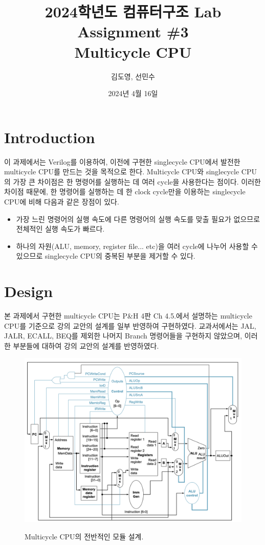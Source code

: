 \documentclass[openright, a4paper]{article}
\title{2024학년도 컴퓨터구조 Lab Assignment \#3\\
        Multicycle CPU}
\author{김도영, 선민수}
\date{2024년 4월 16일}
\begin{document}
\maketitle

\section{Introduction}
이 과제에서는 Verilog를 이용하여, 이전에 구현한 singlecycle CPU에서 발전한 
multicycle CPU를 만드는 것을 목적으로 한다. Multicycle CPU와 singlecycle CPU의 
가장 큰 차이점은 한 명령어를 실행하는 데 여러 cycle을 사용한다는 점이다. 
이러한 차이점 때문에, 한 명령어를 실행하는 데 한 clock cycle만을 이용하는 
singlecycle CPU에 비해 다음과 같은 장점이 있다.

\begin{itemize}
    \item 가장 느린 명령어의 실행 속도에 다른 명령어의 실행 속도를 맞출 필요가
    없으므로 전체적인 실행 속도가 빠르다.

    \item 하나의 자원(ALU, memory, register file... etc)을 여러 cycle에 나누어
    사용할 수 있으므로 singlecycle CPU의 중복된 부분을 제거할 수 있다.
\end{itemize}

\section{Design}
본 과제에서 구현한 multicycle CPU는 P\&H 4판 Ch 4.5.에서 설명하는 multicycle 
CPU를 기준으로 강의 교안의 설계를 일부 반영하여 구현하였다. 교과서에서는 JAL,
JALR, ECALL, BEQ를 제외한 나머지 Branch 명령어들을 구현하지 않았으며, 이러한 
부분들에 대하여 강의 교안의 설계를 반영하였다.

{
    \begin{figure}[!h]
        \centering
        \includegraphics[width=\textwidth]{multicycle-module-diagram.png}
        \label{fig:design}
        \caption{Multicycle CPU의 전반적인 모듈 설계.}
    \end{figure}
}
\end{document}
